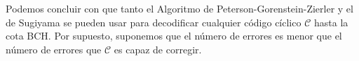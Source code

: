 Podemos concluir con que tanto el Algoritmo de Peterson-Gorenstein-Zierler y el de Sugiyama se pueden usar para decodificar cualquier código cíclico $\mathcal{C}$ hasta la cota BCH. Por supuesto, suponemos que el número de errores es menor que el número de errores que $\mathcal{C}$ es capaz de corregir.%